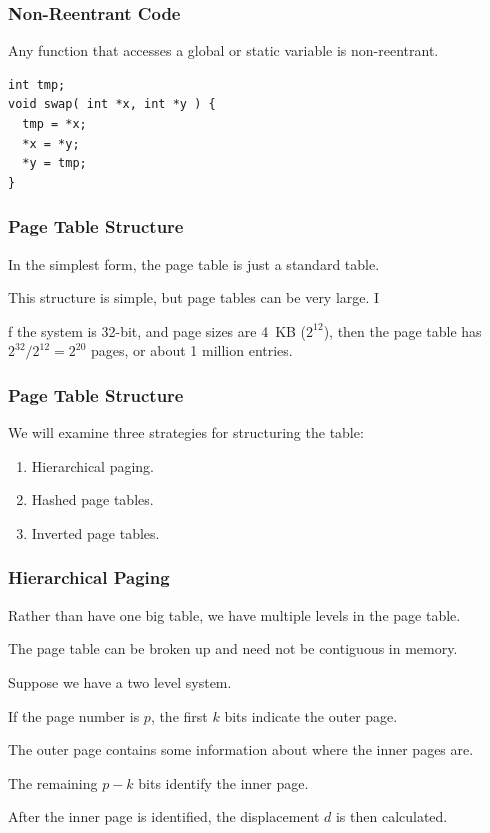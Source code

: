 \begin{frame}[fragile]
\frametitle{Non-Reentrant Code}

Any function that accesses a global or static variable is non-reentrant.

\begin{verbatim}
int tmp;
void swap( int *x, int *y ) {
  tmp = *x;
  *x = *y;
  *y = tmp; 
}
\end{verbatim}

\end{frame}

\begin{frame}
\frametitle{Page Table Structure}

In the simplest form, the page table is just a standard table. 

This structure is simple, but page tables can be very large. I

f the system is 32-bit, and page sizes are 4~KB ($2^{12}$), then the page table has $2^{32}/2^{12} = 2^{20}$ pages, or about 1 million entries.

\end{frame}

\begin{frame}
\frametitle{Page Table Structure}

We will examine three strategies for structuring the table:

\begin{enumerate}
	\item Hierarchical paging.
	\item Hashed page tables.
	\item Inverted page tables.
\end{enumerate}

\end{frame}

\begin{frame}
\frametitle{Hierarchical Paging}

Rather than have one big table, we have multiple levels in the page table. 

The page table can be broken up and need not be contiguous in memory. 

Suppose we have a two level system. 

If the page number is $p$, the first $k$ bits indicate the \alert{outer page}. 

The outer page contains some information about where the \alert{inner pages} are. 

The remaining $p-k$ bits identify the inner page. 

After the inner page is identified, the displacement $d$ is then calculated.


\end{frame}



